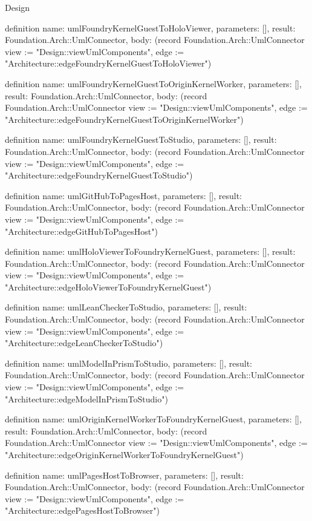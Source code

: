 \begin{lexlean}{Design}
\begin{semanticmodule}
definition{
  name: umlFoundryKernelGuestToHoloViewer,
  parameters: [],
  result: Foundation.Arch::UmlConnector,
  body: (record Foundation.Arch::UmlConnector {view := "Design::viewUmlComponents", edge := "Architecture::edgeFoundryKernelGuestToHoloViewer"})
}

definition{
  name: umlFoundryKernelGuestToOriginKernelWorker,
  parameters: [],
  result: Foundation.Arch::UmlConnector,
  body: (record Foundation.Arch::UmlConnector {view := "Design::viewUmlComponents", edge := "Architecture::edgeFoundryKernelGuestToOriginKernelWorker"})
}

definition{
  name: umlFoundryKernelGuestToStudio,
  parameters: [],
  result: Foundation.Arch::UmlConnector,
  body: (record Foundation.Arch::UmlConnector {view := "Design::viewUmlComponents", edge := "Architecture::edgeFoundryKernelGuestToStudio"})
}

definition{
  name: umlGitHubToPagesHost,
  parameters: [],
  result: Foundation.Arch::UmlConnector,
  body: (record Foundation.Arch::UmlConnector {view := "Design::viewUmlComponents", edge := "Architecture::edgeGitHubToPagesHost"})
}

definition{
  name: umlHoloViewerToFoundryKernelGuest,
  parameters: [],
  result: Foundation.Arch::UmlConnector,
  body: (record Foundation.Arch::UmlConnector {view := "Design::viewUmlComponents", edge := "Architecture::edgeHoloViewerToFoundryKernelGuest"})
}

definition{
  name: umlLeanCheckerToStudio,
  parameters: [],
  result: Foundation.Arch::UmlConnector,
  body: (record Foundation.Arch::UmlConnector {view := "Design::viewUmlComponents", edge := "Architecture::edgeLeanCheckerToStudio"})
}

definition{
  name: umlModelInPrismToStudio,
  parameters: [],
  result: Foundation.Arch::UmlConnector,
  body: (record Foundation.Arch::UmlConnector {view := "Design::viewUmlComponents", edge := "Architecture::edgeModelInPrismToStudio"})
}

definition{
  name: umlOriginKernelWorkerToFoundryKernelGuest,
  parameters: [],
  result: Foundation.Arch::UmlConnector,
  body: (record Foundation.Arch::UmlConnector {view := "Design::viewUmlComponents", edge := "Architecture::edgeOriginKernelWorkerToFoundryKernelGuest"})
}

definition{
  name: umlPagesHostToBrowser,
  parameters: [],
  result: Foundation.Arch::UmlConnector,
  body: (record Foundation.Arch::UmlConnector {view := "Design::viewUmlComponents", edge := "Architecture::edgePagesHostToBrowser"})
}


\end{semanticmodule}
\end{lexlean}
